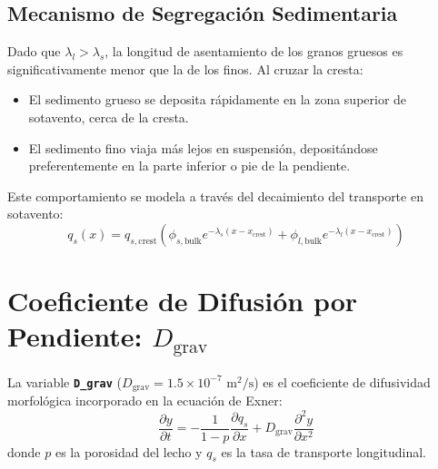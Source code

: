 \documentclass[11pt,a4paper]{article}
\begin{document}
\subsection{Mecanismo de Segregación Sedimentaria}
Dado que $\lambda_l > \lambda_s$, la longitud de asentamiento de los granos gruesos es significativamente menor que la de los finos. Al cruzar la cresta:
\begin{itemize}
    \item El sedimento grueso se deposita rápidamente en la zona superior de sotavento, cerca de la cresta.
    \item El sedimento fino viaja más lejos en suspensión, depositándose preferentemente en la parte inferior o pie de la pendiente.
\end{itemize}
Este comportamiento se modela a través del decaimiento del transporte en sotavento:
\begin{equation}
    q_s(x) = q_{s,\text{crest}} \left( \phi_{s,\text{bulk}} e^{-\lambda_s(x - x_{\text{crest}})} + \phi_{l,\text{bulk}} e^{-\lambda_l(x - x_{\text{crest}})} \right)
\end{equation}

\section{Coeficiente de Difusión por Pendiente: $D_{\text{grav}}$}
La variable \textbf{\texttt{D\_grav}} ($D_{\text{grav}} = 1.5 \times 10^{-7} \text{ m}^2/\text{s}$) es el coeficiente de difusividad morfológica incorporado en la ecuación de Exner:
\begin{equation}
    \frac{\partial y}{\partial t} = -\frac{1}{1 - p} \frac{\partial q_s}{\partial x} + D_{\text{grav}} \frac{\partial^2 y}{\partial x^2}
\end{equation}
donde $p$ es la porosidad del lecho y $q_s$ es la tasa de transporte longitudinal.
\end{document}
